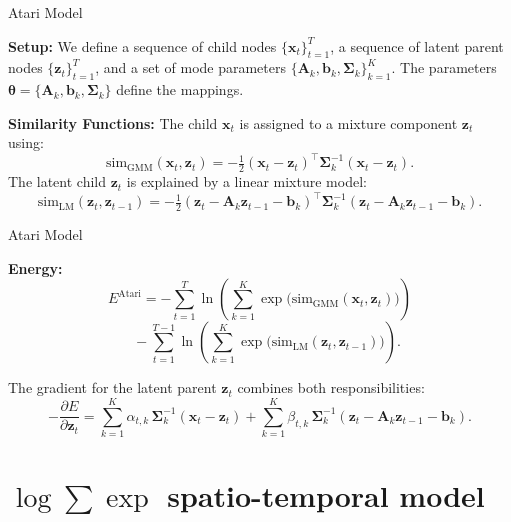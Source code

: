 \documentclass{beamer}
\begin{document}
    
\begin{frame}{Atari Model}

    \textbf{Setup:}  
    We define a sequence of child nodes \(\{\bm{x}_t\}_{t=1}^T\), a sequence of latent parent nodes \(\{\bm{z}_t\}_{t=1}^T\), and a set of mode parameters \(\{\bm{A}_k, \bm{b}_k, \bm{\Sigma}_k\}_{k=1}^K\). The parameters \(\bm{\theta} = \{\bm{A}_k, \bm{b}_k, \bm{\Sigma}_k\}\) define the mappings.

    \bigskip
    
    \textbf{Similarity Functions:}  
    The child \(\bm{x}_t\) is assigned to a mixture component \(\bm{z}_t\) using:
    \[
    \mathrm{sim}_{\text{GMM}}(\bm{x}_t, \bm{z}_t)
    =
    -\tfrac{1}{2} (\bm{x}_t - \bm{z}_t)^\top \bm{\Sigma}_k^{-1} (\bm{x}_t - \bm{z}_t).
    \]
    The latent child \(\bm{z}_{t}\) is explained by a linear mixture model:
    \[
    \mathrm{sim}_{\text{LM}}(\bm{z}_t, \bm{z}_{t-1})
    =
    -\tfrac{1}{2} (\bm{z}_t - \bm{A}_k \bm{z}_{t-1} - \bm{b}_k)^\top \bm{\Sigma}_k^{-1} (\bm{z}_t - \bm{A}_k \bm{z}_{t-1} - \bm{b}_k).
    \]

\end{frame}

\begin{frame}{Atari Model}

    \textbf{Energy:}  
    \[
    E^{\mathrm{Atari}}
    = -\sum_{t=1}^{T} 
    \ln \left(
    \sum_{k=1}^K \exp\bigl(\mathrm{sim}_{\text{GMM}}(\bm{x}_t, \bm{z}_t)\bigr)
    \right)
    \]
    \[
    \quad -\sum_{t=1}^{T-1} 
    \ln \left(
    \sum_{k=1}^K \exp\bigl(\mathrm{sim}_{\text{LM}}(\bm{z}_t, \bm{z}_{t-1})\bigr)
    \right).
    \]

    The gradient for the latent parent \(\bm{z}_t\) combines both responsibilities:
    \[
    -\frac{\partial E}{\partial \bm{z}_t}
    =
    \sum_{k=1}^K \alpha_{t,k} \,\bm{\Sigma}_k^{-1} (\bm{x}_t - \bm{z}_t)
    + \sum_{k=1}^K \beta_{t,k} \,\bm{\Sigma}_k^{-1} (\bm{z}_t - \bm{A}_k \bm{z}_{t-1} - \bm{b}_k).
    \]

\end{frame}
    

\section{$\log \sum \exp$ spatio-temporal model}
\end{document}

